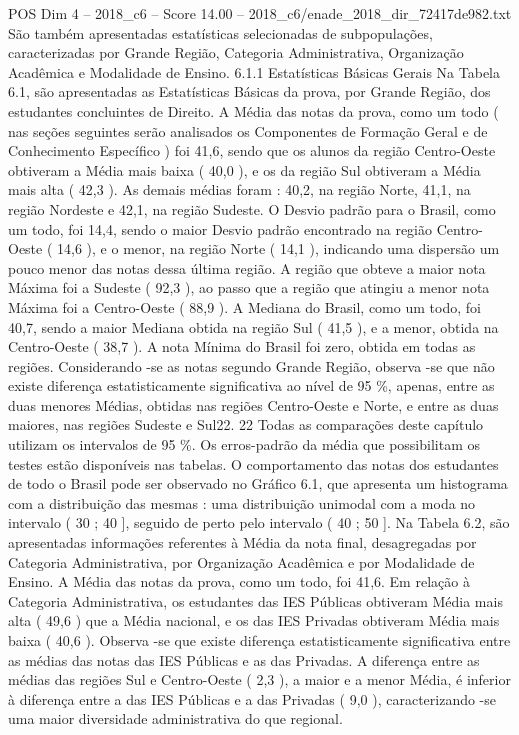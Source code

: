 \begin{textsample}{POS Dim 4 – 2018\_c6 – Score 14.00 – 2018\_c6/enade\_2018\_dir\_72417de982.txt}
São também apresentadas estatísticas selecionadas de subpopulações, caracterizadas por Grande Região, Categoria Administrativa, Organização Acadêmica e Modalidade de Ensino. 6.1.1 Estatísticas Básicas Gerais Na Tabela 6.1, são apresentadas as Estatísticas Básicas da prova, por Grande Região, dos estudantes concluintes de Direito.
A Média das notas da prova, como um todo ( nas seções seguintes serão analisados os Componentes de Formação Geral e de Conhecimento Específico ) foi 41,6, sendo que os alunos da região Centro-Oeste obtiveram a Média mais baixa ( 40,0 ), e os da região Sul obtiveram a Média mais alta ( 42,3 ).
As demais médias foram : 40,2, na região Norte, 41,1, na região Nordeste e 42,1, na região Sudeste.
O Desvio padrão para o Brasil, como um todo, foi 14,4, sendo o maior Desvio padrão encontrado na região Centro-Oeste ( 14,6 ), e o menor, na região Norte ( 14,1 ), indicando uma dispersão um pouco menor das notas dessa última região.
A região que obteve a maior nota Máxima foi a Sudeste ( 92,3 ), ao passo que a região que atingiu a menor nota Máxima foi a Centro-Oeste ( 88,9 ).
A Mediana do Brasil, como um todo, foi 40,7, sendo a maior Mediana obtida na região Sul ( 41,5 ), e a menor, obtida na Centro-Oeste ( 38,7 ).
A nota Mínima do Brasil foi zero, obtida em todas as regiões.
Considerando -se as notas segundo Grande Região, observa -se que não existe diferença estatisticamente significativa ao nível de 95 \%, apenas, entre as duas menores Médias, obtidas nas regiões Centro-Oeste e Norte, e entre as duas maiores, nas regiões Sudeste e Sul22. 22 Todas as comparações deste capítulo utilizam os intervalos de 95 \%.
Os erros-padrão da média que possibilitam os testes estão disponíveis nas tabelas.
O comportamento das notas dos estudantes de todo o Brasil pode ser observado no Gráfico 6.1, que apresenta um histograma com a distribuição das mesmas : uma distribuição unimodal com a moda no intervalo ( 30 ; 40 ], seguido de perto pelo intervalo ( 40 ; 50 ].
Na Tabela 6.2, são apresentadas informações referentes à Média da nota final, desagregadas por Categoria Administrativa, por Organização Acadêmica e por Modalidade de Ensino.
A Média das notas da prova, como um todo, foi 41,6.
Em relação à Categoria Administrativa, os estudantes das IES Públicas obtiveram Média mais alta ( 49,6 ) que a Média nacional, e os das IES Privadas obtiveram Média mais baixa ( 40,6 ).
Observa -se que existe diferença estatisticamente significativa entre as médias das notas das IES Públicas e as das Privadas.
A diferença entre as médias das regiões Sul e Centro-Oeste ( 2,3 ), a maior e a menor Média, é inferior à diferença entre a das IES Públicas e a das Privadas ( 9,0 ), caracterizando -se uma maior diversidade administrativa do que regional.

\end{textsample}
